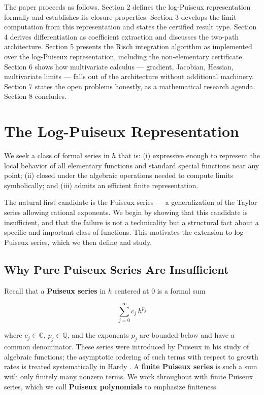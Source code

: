 \documentclass[12pt]{article}
\begin{document}
The paper proceeds as follows. Section 2 defines the log-Puiseux
representation formally and establishes its closure properties. Section
3 develops the limit computation from this representation and states the
certified result type. Section 4 derives differentiation as coefficient
extraction and discusses the two-path architecture. Section 5 presents
the Risch integration algorithm as implemented over the log-Puiseux
representation, including the non-elementary certificate. Section 6
shows how multivariate calculus --- gradient, Jacobian, Hessian,
multivariate limits --- falls out of the architecture without additional
machinery. Section 7 states the open problems honestly, as a
mathematical research agenda. Section 8 concludes.




\section{The Log-Puiseux
Representation}\label{the-log-puiseux-representation}

We seek a class of formal series in \(h\) that is: (i) expressive enough
to represent the local behavior of all elementary functions and standard
special functions near any point; (ii) closed under the algebraic
operations needed to compute limits symbolically; and (iii) admits an
efficient finite representation.

The natural first candidate is the Puiseux series --- a generalization
of the Taylor series allowing rational exponents. We begin by showing
that this candidate is insufficient, and that the failure is not a
technicality but a structural fact about a specific and important class
of functions. This motivates the extension to log-Puiseux series, which
we then define and study.


\subsection{Why Pure Puiseux Series Are
Insufficient}\label{why-pure-puiseux-series-are-insufficient}

Recall that a \textbf{Puiseux series} in \(h\) centered at \(0\) is a
formal sum

\[\sum_{j=0}^{\infty} c_j \, h^{p_j}\]

where \(c_j \in \mathbb{C}\), \(p_j \in \mathbb{Q}\), and the exponents
\(p_j\) are bounded below and have a common denominator. These series
were introduced by Puiseux \cite{puiseux1850} in his study of algebraic
functions; the asymptotic ordering of such terms with respect to growth
rates is treated systematically in Hardy \cite{hardy1910}. A
\textbf{finite Puiseux series} is such a sum with only finitely many
nonzero terms. We work throughout with finite Puiseux series, which we
call \textbf{Puiseux polynomials} to emphasize finiteness.
\end{document}
